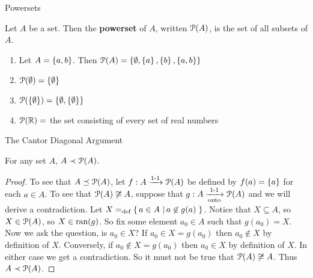 \documentclass[pdf,final]{prosper}
\newcommand{\skipsmall}{\vspace{1em}}
\newcommand{\skipmed}{\vspace{2em}}
\begin{document}
\begin{slide}{Powersets}
\begin{definition}
Let $A$ be a set. Then the \textbf{powerset} of $A$, written $\operatorname{\mathcal{P}}(A)$, is the set
of all subsets of $A$.
\end{definition}

\skipmed

\begin{example}


\begin{enumerate}
  \item Let $A=\left\{a,b\right\}$. Then 
  $\operatorname{\mathcal{P}}(A)=\left\{\emptyset,\left\{a\right\},\left\{b\right\},\left\{a,b\right\}\right\}$ 
  \item $\operatorname{\mathcal{P}}(\emptyset)=\left\{\emptyset\right\}$
  \item 
  $\operatorname{\mathcal{P}}(\left\{\emptyset\right\})=\left\{\emptyset,\left\{\emptyset\right\}\right\}$
  \item $\operatorname{\mathcal{P}}(\mathbb{R}) = $ the set consisting of every set of real numbers
\end{enumerate}


\end{example}


\end{slide}

\begin{slide}{The Cantor Diagonal Argument}
\begin{theorem}
For any set $A$, $A\prec \operatorname{\mathcal{P}}(A)$.
\end{theorem}

\skipsmall

\begin{proof}
To see that $A\preceq \operatorname{\mathcal{P}}(A)$, let $f:A\xrightarrow{\text{1-1}} \operatorname{\mathcal{P}}(A)$ be defined
by $f(a)=\left\{a\right\}$ for each $a\in A$. To see that $\operatorname{\mathcal{P}}(A)\not\cong A$, suppose
that $g:A\xrightarrow[\text{onto}]{\text{1-1}} \operatorname{\mathcal{P}}(A)$ and we will derive a contradiction. Let
$X=_{\text{def}} \left\{ \, a\in A \, \left| \, a \not\in g(a) \, \right.\right\}$. Notice that $X\subseteq A$, so
$X\in\operatorname{\mathcal{P}}(A)$, so $X\in\operatorname{ran}(g)$. So fix some element $a_0\in A$ such that
$g(a_0)=X$. Now we ask the question, is $a_0\in X$? If $a_0\in X=g(a_0)$ then
$a_0\not\in X$ by definition of $X$. Conversely, if $a_0\not\in X = g(a_0)$
then $a_0 \in X$ by definition of $X$. In either case we get a contradiction. So
it must not be true that $\operatorname{\mathcal{P}}(A)\not\cong A$. Thus $A\prec \operatorname{\mathcal{P}}(A)$.
\end{proof}


\end{slide}
\end{document}

